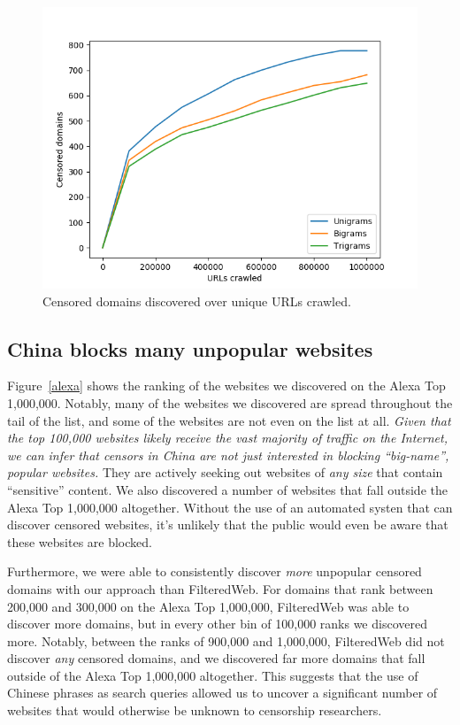 \begin{figure}[b]
  \centering
  \includegraphics[scale=0.5]{figures/urls-crawled}
  \caption{\label{censored-vs-urls} Censored domains discovered over unique URLs crawled. }
\end{figure}

\subsection{China blocks many unpopular websites}

Figure~\ref{alexa} shows the ranking of the websites we discovered on
the Alexa Top 1,000,000. Notably, many of the websites we discovered
are spread throughout the tail of the list, and some of the websites
are not even on the list at all. \textit{Given that the top 100,000 websites
likely receive the vast majority of traffic on the Internet, we can
infer that censors in China are not just interested in blocking
``big-name'', popular websites.} They are actively seeking out websites
of \textit{any size} that contain ``sensitive'' content. We also
discovered a number of websites that fall outside the Alexa Top
1,000,000 altogether. Without the use of an automated systen that can
discover censored websites, it's unlikely that the public would even
be aware that these websites are blocked.

Furthermore, we were able to consistently discover \textit{more} unpopular
censored domains with our approach than FilteredWeb. For domains that
rank between 200,000 and 300,000 on the Alexa Top 1,000,000,
FilteredWeb was able to discover more domains, but in every other bin of
100,000 ranks we discovered more. Notably, between the ranks of 900,000
and 1,000,000, FilteredWeb did not discover \textit{any} censored domains, and
we discovered far more domains that fall outside of the Alexa Top
1,000,000 altogether. This suggests that the use of Chinese phrases
as search queries allowed us to uncover a significant number of
websites that would otherwise be unknown to censorship researchers.

